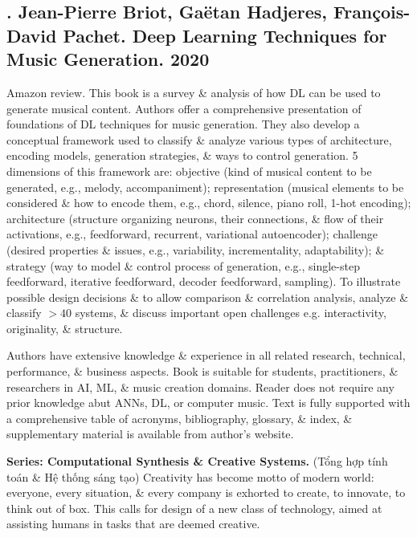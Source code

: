\documentclass{article}
\begin{document}

\subsection{\cite{Briot_Hadjeres_Pachet2020}. {\sc Jean-Pierre Briot, Ga\"etan Hadjeres, Fran\c{c}ois-David Pachet}. Deep Learning Techniques for Music Generation. 2020}
{}

{\sf Amazon review.} This book is a survey \& analysis of how DL can be used to generate musical content. Authors offer a comprehensive presentation of foundations of DL techniques for music generation. They also develop a conceptual framework used to classify \& analyze various types of architecture, encoding models, generation strategies, \& ways to control generation. 5 dimensions of this framework are: objective (kind of musical content to be generated, e.g., melody, accompaniment); representation (musical elements to be considered \& how to encode them, e.g., chord, silence, piano roll, 1-hot encoding); architecture (structure organizing neurons, their connections, \& flow of their activations, e.g., feedforward, recurrent, variational autoencoder); challenge (desired properties \& issues, e.g., variability, incrementality, adaptability); \& strategy (way to model \& control process of generation, e.g., single-step feedforward, iterative feedforward, decoder feedforward, sampling). To illustrate possible design decisions \& to allow comparison \& correlation analysis, analyze \& classify $> 40$ systems, \& discuss important open challenges e.g. interactivity, originality, \& structure.

Authors have extensive knowledge \& experience in all related research, technical, performance, \& business aspects. Book is suitable for students, practitioners, \& researchers in AI, ML, \& music creation domains. Reader does not require any prior knowledge abut ANNs, DL, or computer music. Text is fully supported with a comprehensive table of acronyms, bibliography, glossary, \& index, \& supplementary material is available from author's website.

{\bf Series: Computational Synthesis \& Creative Systems.} (Tổng hợp tính toán \& Hệ thống sáng tạo) Creativity has become motto of modern world: everyone, every situation, \& every company is exhorted to create, to innovate, to think out of box. This calls for design of a new class of technology, aimed at assisting humans in tasks that are deemed creative.
\end{document}
